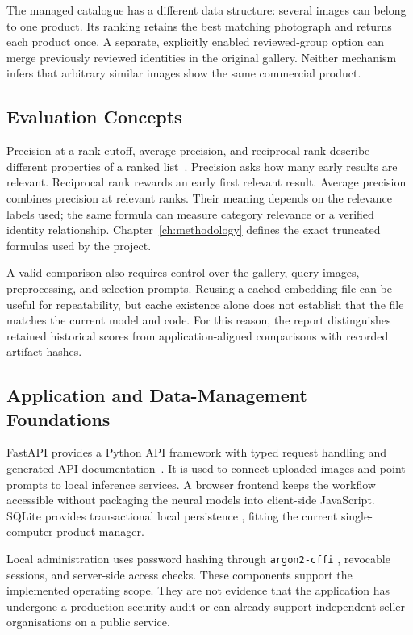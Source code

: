The managed catalogue has a different data structure: several images can
belong to one product. Its ranking retains the best matching photograph and
returns each product once. A separate, explicitly enabled reviewed-group option
can merge previously reviewed identities in the original gallery. Neither
mechanism infers that arbitrary similar images show the same commercial product.

\subsection{Evaluation Concepts}
Precision at a rank cutoff, average precision, and reciprocal rank describe
different properties of a ranked list~\cite{Manning2008IR}. Precision asks how
many early results are relevant. Reciprocal rank rewards an early first relevant
result. Average precision combines precision at relevant ranks. Their meaning
depends on the relevance labels used; the same formula can measure category
relevance or a verified identity relationship. Chapter~\ref{ch:methodology}
defines the exact truncated formulas used by the project.

A valid comparison also requires control over the gallery, query images,
preprocessing, and selection prompts. Reusing a cached embedding file can be
useful for repeatability, but cache existence alone does not establish that
the file matches the current model and code. For this reason, the report
distinguishes retained historical scores from application-aligned comparisons
with recorded artifact hashes.

\subsection{Application and Data-Management Foundations}
FastAPI provides a Python API framework with typed request handling and generated
API documentation~\cite{FastAPIDocumentation}. It is used to connect uploaded
images and point prompts to local inference services. A browser frontend keeps
the workflow accessible without packaging the neural models into client-side
JavaScript. SQLite provides transactional local persistence
\cite{SQLiteTransactions}, fitting the current single-computer product manager.

Local administration uses password hashing through \texttt{argon2-cffi}
\cite{Argon2Parameters}, revocable sessions, and server-side access checks.
These components support the implemented operating scope. They are not evidence
that the application has undergone a production security audit or can already
support independent seller organisations on a public service.

